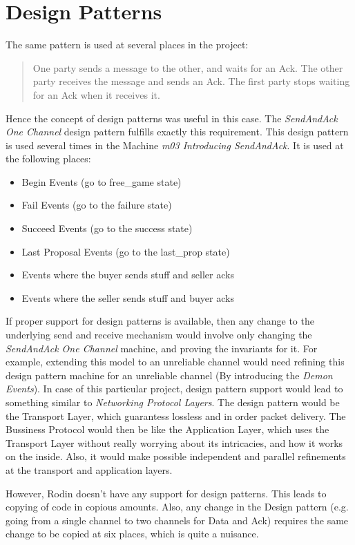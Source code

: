\section{Design Patterns}
\label{designpatterns}
The same pattern is used at several places in the project: 
\begin{quote}
  One party sends a message to the other, and waits for an Ack. The other party receives the message and sends an Ack. The first party stops waiting for an Ack when it receives it.
\end{quote}
Hence the concept of design patterns was useful in this case. The \emph{SendAndAck One Channel} design pattern fulfills exactly this requirement. This design pattern is used several times in the Machine \emph{m03 Introducing SendAndAck}. It is used at the following places:
\begin{itemize}
\item Begin Events (go to free\_game state)
\item Fail Events (go to the failure state)
\item Succeed Events (go to the success state)
\item Last Proposal Events (go to the last\_prop state)
\item Events where the buyer sends stuff and seller acks
\item Events where the seller sends stuff and buyer acks
\end{itemize}

If proper support for design patterns is available, then any change to the underlying send and receive mechanism would involve only changing the \emph{SendAndAck One Channel} machine, and proving the invariants for it. For example, extending this model to an unreliable channel would need refining this design pattern machine for an unreliable channel (By introducing the \emph{Demon Events}). In case of this particular project, design pattern support would lead to something similar to \emph{Networking Protocol Layers}. The design pattern would be the Transport Layer, which guarantess lossless and in order packet delivery. The Bussiness Protocol would then be like the Application Layer, which uses the Transport Layer without really worrying about its intricacies, and how it works on the inside. Also, it would make possible independent and parallel refinements at the transport and application layers.

However, Rodin doesn't have any support for design patterns. This leads to copying of code in copious amounts. Also, any change in the Design pattern (e.g. going from a single channel to two channels for Data and Ack) requires the same change to be copied at six places, which is quite a nuisance.
